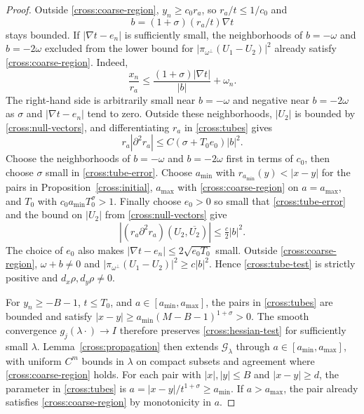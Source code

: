 \documentclass[11pt,a4paper]{article}
\theoremstyle{definition}
\theoremstyle{remark}
\numberwithin{equation}{section}
\begin{document}
\begin{proof}
Outside \eqref{cross:coarse-region}, $y_n\ge c_0r_a$, so
$r_a/t\le1/c_0$ and
\[
 b=(1+\sigma)(r_a/t)\nabla t
\]
stays bounded.  If $|\nabla t-e_n|$ is sufficiently small,
the neighborhoods of $b=-\omega$ and $b=-2\omega$ excluded from the
lower bound for $|\pi_{\omega^\perp}(U_1-U_2)|^2$ already satisfy
\eqref{cross:coarse-region}.  Indeed,
\[
 \frac{x_n}{r_a}
 \le \frac{(1+\sigma)|\nabla t|}{|b|}+\omega_n.
\]
The right-hand side is arbitrarily small near $b=-\omega$ and negative
near $b=-2\omega$ as $\sigma$ and $|\nabla t-e_n|$ tend to zero.
Outside these neighborhoods, $|U_2|$ is bounded by
\eqref{cross:null-vectors}, and differentiating $r_a$ in
\eqref{cross:tubes} gives
\begin{equation}\label{cross:tube-error}
 r_a|\partial^2r_a|
 \le C(\sigma+T_0e_0)|b|^2.
\end{equation}
Choose the neighborhoods of $b=-\omega$ and $b=-2\omega$ first in
terms of $c_0$, then choose $\sigma$ small in \eqref{cross:tube-error}.
Choose $a_{\min}$ with $r_{a_{\min}}(y)<|x-y|$ for the pairs in
Proposition~\ref{cross:initial}, $a_{\max}$ with
\eqref{cross:coarse-region} on $a=a_{\max}$, and $T_0$ with
$c_0a_{\min}T_0^\sigma>1$. Finally choose $e_0>0$ so small that
\eqref{cross:tube-error} and the bound on $|U_2|$ from
\eqref{cross:null-vectors} give
\[
 |(r_a\partial^2r_a)(U_2,\overline{U_2})|
 \le \tfrac c2|b|^2.
\]
The choice of $e_0$ also makes $|\nabla t-e_n|\le2\sqrt{e_0T_0}$ small.
Outside \eqref{cross:coarse-region}, $\omega+b\ne0$ and
$|\pi_{\omega^\perp}(U_1-U_2)|^2\ge c|b|^2$. Hence
\eqref{cross:tube-test} is strictly positive and $d_x\rho,d_y\rho\ne0$.

For $y_n\ge-B-1$, $t\le T_0$, and $a\in[a_{\min},a_{\max}]$,
the pairs in \eqref{cross:tubes} are bounded and satisfy
$|x-y|\ge a_{\min}(M-B-1)^{1+\sigma}>0$.
The smooth convergence $g_j(\lambda\cdot)\to I$ therefore preserves
\eqref{cross:hessian-test} for sufficiently small $\lambda$.
Lemma~\ref{cross:propagation} then extends $\mathcal G_\lambda$ through
$a\in[a_{\min},a_{\max}]$, with uniform $C^m$ bounds in $\lambda$
on compact subsets and agreement where \eqref{cross:coarse-region} holds.
For each pair with $|x|,|y|\le B$ and $|x-y|\ge d$, the parameter in
\eqref{cross:tubes} is
$a=|x-y|/t^{1+\sigma}\ge a_{\min}$.
If $a>a_{\max}$, the pair already satisfies
\eqref{cross:coarse-region} by monotonicity in $a$.


\end{proof}
\end{document}

